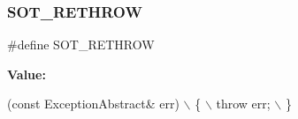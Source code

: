 \subsubsection{\texorpdfstring{S\+O\+T\+\_\+\+R\+E\+T\+H\+R\+OW}{SOT\_RETHROW}}
{\footnotesize\ttfamily \#define S\+O\+T\+\_\+\+R\+E\+T\+H\+R\+OW}

{\bfseries Value\+:}
\begin{DoxyCode}
(\textcolor{keyword}{const} ExceptionAbstract& err) \(\backslash\)
    \{                              \(\backslash\)
        throw err;                 \(\backslash\)
    \}
\end{DoxyCode}
